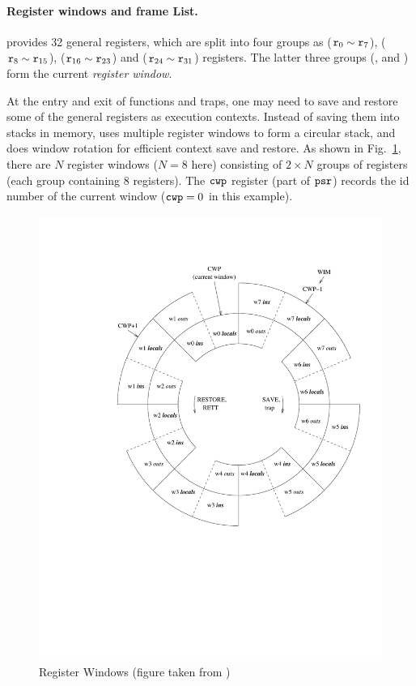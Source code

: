 \paragraph{\textbf{Register windows and frame List.}}
\sparc{} provides 32 general registers, which are split into
four groups
as \globalRN{} ($\texttt{r}_{0} \sim \texttt{r}_{7}$),
\outRN{} ($\texttt{r}_{8} \sim \texttt{r}_{15}$), \localRN ($\texttt{r}_{16} \sim \texttt{r}_{23}$)
and \inRN{} ($\texttt{r}_{24} \sim \texttt{r}_{31}$) registers.
The latter three groups (\outRN{}, \localRN{} and \inRN{})
form the current {\em register window}.

At the entry and exit of functions and traps, one may need to
save and restore some of the general registers as execution
contexts. Instead of saving them into stacks in memory,
\sparc{} uses multiple register windows to form a circular
stack, and does window rotation for efficient context save and restore.
As shown in Fig.~\ref{fig:RegisterWindows}, there are $N$
register windows ($N=8$ here) consisting of $2\times N$
groups of registers (each group containing 8 registers).
The $\texttt{cwp}$ register (part of $\texttt{psr}$) records the id number
of the current window ($\texttt{cwp}=0$ in this example).
\begin{figure}[!t]
	\centering
	\includegraphics[width=59ex]{window}
	\caption{Register Windows (figure taken from \cite{sparc})}
	\label{fig:RegisterWindows}
\end{figure}

